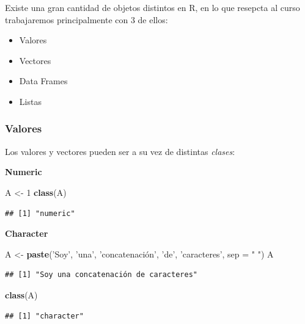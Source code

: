 \documentclass[]{book}
\newenvironment{Shaded}{\begin{snugshade}}{\end{snugshade}}
\newcommand{\DecValTok}[1]{\textcolor[rgb]{0.00,0.00,0.81}{#1}}
\newcommand{\KeywordTok}[1]{\textcolor[rgb]{0.13,0.29,0.53}{\textbf{#1}}}
\newcommand{\NormalTok}[1]{#1}
\newcommand{\StringTok}[1]{\textcolor[rgb]{0.31,0.60,0.02}{#1}}
\providecommand{\tightlist}{%
  \setlength{\itemsep}{0pt}\setlength{\parskip}{0pt}}
\begin{document}
Existe una gran cantidad de objetos distintos en R, en lo que resepcta al curso trabajaremos principalmente con 3 de ellos:

\begin{itemize}
\tightlist
\item
  Valores
\item
  Vectores
\item
  Data Frames
\item
  Listas
\end{itemize}

\hypertarget{valores}{%
\subsubsection{Valores}\label{valores}}

Los valores y vectores pueden ser a su vez de distintas \emph{clases}:

\textbf{Numeric}

\begin{Shaded}
\begin{Highlighting}[]
\NormalTok{A <-}\StringTok{  }\DecValTok{1}
\KeywordTok{class}\NormalTok{(A)}
\end{Highlighting}
\end{Shaded}

\begin{verbatim}
## [1] "numeric"
\end{verbatim}

\textbf{Character}

\begin{Shaded}
\begin{Highlighting}[]
\NormalTok{A <-}\StringTok{  }\KeywordTok{paste}\NormalTok{(}\StringTok{'Soy'}\NormalTok{, }\StringTok{'una'}\NormalTok{, }\StringTok{'concatenación', '}\NormalTok{de}\StringTok{', '}\NormalTok{caracteres}\StringTok{', sep = " ")}
\StringTok{A}
\end{Highlighting}
\end{Shaded}

\begin{verbatim}
## [1] "Soy una concatenación de caracteres"
\end{verbatim}

\begin{Shaded}
\begin{Highlighting}[]
\KeywordTok{class}\NormalTok{(A)}
\end{Highlighting}
\end{Shaded}

\begin{verbatim}
## [1] "character"
\end{verbatim}
\end{document}
